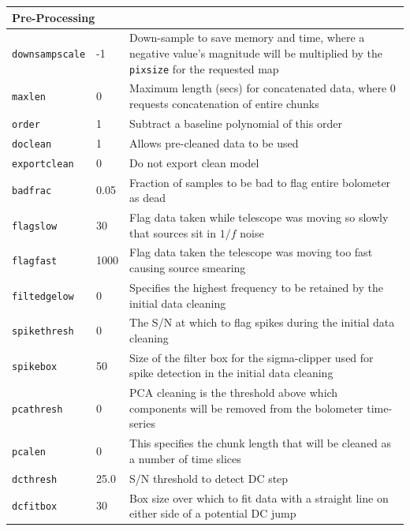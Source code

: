 \documentclass[twoside,11pt]{article}
\renewcommand{\_}{\texttt{\symbol{95}}}
\newcommand{\param}[1]{\texttt{#1}}
\begin{document}
\begin{htmlonly}
\begin{table}
\begin{center}
\begin{small}
\begin{tabular}{|p{2.2cm}|p{1.1cm}|p{11.4cm}|}
\hline
\multicolumn{3}{|l|}{\textbf{Pre-Processing}}\\
\hline
\param{downsampscale} &   -1 & Down-sample to save memory and time, where a
                               negative value's magnitude will be multiplied by
                               the \param{pixsize} for the requested map \\
\param{maxlen}        &    0 & Maximum length (secs) for concatenated data, where 0
                               requests concatenation of entire chunks \\
\param{order}         &    1 & Subtract a baseline polynomial of this order \\
\param{doclean}       &    1 & Allows pre-cleaned data to be used \\
\param{exportclean}   &    0 & Do not export clean model \\
\param{badfrac}       & 0.05 & Fraction of samples to be bad to flag entire
                               bolometer as dead \\
\param{flagslow}      &   30 & Flag data taken while telescope was moving so slowly
                               that sources sit in $1/f$ noise \\
\param{flagfast}      & 1000 & Flag data taken the telescope was moving too fast
                               causing source smearing \\
\param{filt\_edgelow} &    0 & Specifies the highest frequency to be retained by the
                               initial data cleaning \\
\param{spikethresh}   &    0 & The S/N at which to flag spikes during the initial
                               data cleaning \\
\param{spikebox}      &   50 & Size of the filter box for the sigma-clipper used
                               for spike detection in the initial data cleaning \\
\param{pcathresh}     &    0 & PCA cleaning is the threshold above which components
                               will be removed from the bolometer time-series \\
\param{pcalen}        &    0 & This specifies the chunk length that will be cleaned
                               as a number of time slices \\
\param{dcthresh}      & 25.0 & S/N threshold to detect DC step \\
\param{dcfitbox}      &   30 & Box size over which to fit data with a straight
                               line on either side of a potential DC jump \\

\end{tabular}
\end{small}
\end{center}
\end{table}
\end{htmlonly}
\end{document}
